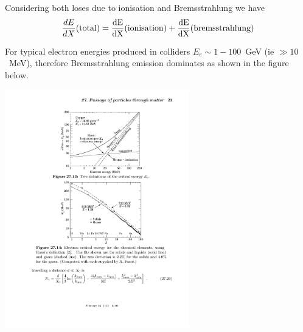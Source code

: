 Considering both loses due to ionisation and Bremsstrahlung we have
\begin{equation}
\frac{dE}{dX}(\rm total)=\frac{dE}{dX}({\rm ionisation})+\frac{dE}{dX}({\rm bremsstrahlung})
\end{equation}

For typical electron energies produced in colliders $E_{e}\sim 1-100$~GeV (ie $\gg10$~MeV), therefore Bremsstrahlung emission dominates as shown in the figure below.
\begin{center}
\includegraphics[width=0.6\textwidth]{fig/detector/e_energy_brem_vs_ion.pdf}
\end{center}

